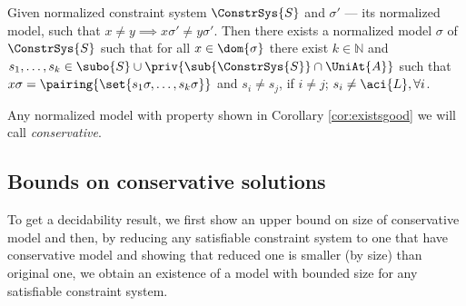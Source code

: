 \begin{cor}\label{cor:existsgood}
	 Given normalized constraint system $\ConstrSys{S}$ and $\sigma'$ --- its normalized model,   such that $x\neq y \implies x\sigma' \neq y\sigma'$. Then there exists a normalized model $\sigma$ of  $\ConstrSys{S}$ such that for all $x\in \dom{\sigma}$ there exist $k \in \mathbb{N}$ and $s_1,\dots, s_k \in \subo{S}\cup \priv{\sub{\ConstrSys{S}}\cap\UniAt{A}}$ such that $x\sigma = \pairing{\set{s_1\sigma, \dots, s_k\sigma}}$ and $s_i \neq s_j$, if $i\neq j$; $s_i\neq\aci{L}, \forall i$.


\end{cor}
 Any normalized model with property shown in Corollary \ref{cor:existsgood} we will call \emph{conservative}.

\subsection{Bounds on conservative solutions}
\label{subs:bounds}

To get a decidability result, 
we first show an upper bound on size of conservative model 
and then, 
by reducing any satisfiable constraint system to one that have 
conservative model and showing that reduced one is smaller
(by size) than original one,
we obtain an existence of a model with bounded size for any 
satisfiable constraint system.



